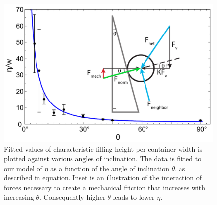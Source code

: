 %
\begin{figure}
	\includegraphics[width=\textwidth]{Figures/chapter2/etavtheta.pdf}
	\caption{Fitted values of characteristic filling height per container width is plotted against various angles of inclination. The data is fitted to our model of $\eta$ as a function of the angle of inclination $\theta$, as described in equation. Inset is an illustration of the interaction of forces necessary to create a mechanical friction that increases with increasing $\theta$. Consequently higher $\theta$ leads to lower $\eta$.}
	\label{fig:etavtheta}
\end{figure}

